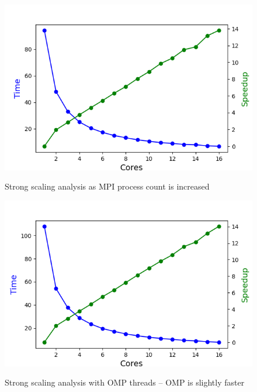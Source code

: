 \begin{figure}[h]
  \begin{minipage}{0.45\linewidth}
      \includegraphics[width=\linewidth]{figs/mpi_strong.out}
      \caption{Strong scaling analysis as MPI process count is increased}
      \label{fig:mpi_strong}
    \end{minipage}
  \hspace{.05\linewidth}
 \begin{minipage}{0.45\linewidth}
  \includegraphics[width=\linewidth]{figs/omp_strong.out}
  \caption{Strong scaling analysis with OMP threads -- OMP is slightly faster}
    \label{fig:omp_strong}
    \end{minipage}
\end{figure}

